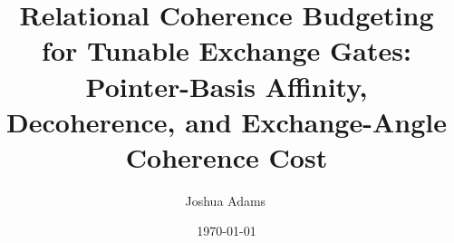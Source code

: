\usepackage{hyperref}

\usepackage{orcidlink}

\setlength{\emergencystretch}{2em}

\newcommand{\RCF}{\textsc{rcf}}
\newcommand{\URA}{U_{\!\mathrm{RA}}}
\newcommand{\rhoSE}{\rho_{SE}}

\newtheorem{theorem}{Theorem}
\newtheorem{proposition}{Proposition}
\newtheorem{corollary}{Corollary}
\newtheorem{definition}{Definition}
\newtheorem{remark}{Remark}



\title{Relational Coherence Budgeting for Tunable Exchange Gates:
       Pointer-Basis Affinity, Decoherence, and Exchange-Angle
       Coherence Cost}

\author{Joshua Adams\,}

\date{\today}


